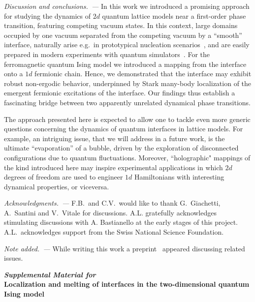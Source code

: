 \documentclass[reprint,aps,prl,superscriptaddress,english,nolongbibliography]{revtex4-2}
\begin{document}
\emph{Discussion and conclusions.~---}
In this work we introduced a promising approach for studying the dynamics of $2d$ quantum lattice models near a first-order phase transition, featuring competing vacuum states. In this context, large domains occupied by one vacuum separated from the competing vacuum by a ``smooth'' interface, naturally arise e.g.\ in prototypical nucleation scenarios~\cite{bray1994theory,onuki2002phase,Coleman1977False,coleman1988aspects,Rutkevich1999Decay}, and are easily prepared in modern experiments with quantum simulators~\cite{labuhn2016tunable,Guardado2018Probing,scholl2021quantum,ebadi2021quantum,Bluvstein2022Quantum}. For the ferromagnetic quantum Ising model we introduced a mapping from the interface onto a $1d$ fermionic chain. Hence, we demonstrated that the interface may exhibit robust non-ergodic behavior, underpinned by Stark many-body localization of the emergent fermionic excitations of the interface. Our findings thus establish a fascinating bridge between two apparently unrelated  dynamical phase transitions.

The approach presented here is expected to allow one to tackle even more generic questions concerning the dynamics of quantum interfaces in lattice models. For example, an intriguing issue, that we will address in a future work, is the ultimate ``evaporation'' of a bubble, driven by the exploration of disconnected configurations due to quantum fluctuations. Moreover, ``holographic" mappings of the kind introduced here may inspire experimental applications in which $2d$ degrees of freedom are used to engineer $1d$ Hamiltonians with interesting dynamical properties, or viceversa.




\begin{acknowledgments}

\emph{Acknowledgments.~---}
F.B.\ and C.V.\ would like to thank G.\ Giachetti, A.\ Santini and V.\ Vitale for discussions.
A.L. gratefully acknowledges stimulating discussions with A. Bastianello at the early stages of this project.
A.L.\ acknowledges support from the Swiss National Science Foundation.

\emph{Note added.~---}
While writing this work a preprint~\cite{Hart2022Hilbert} appeared discussing related issues. 

\end{acknowledgments}



\newpage
\widetext
\begin{center}
\textbf{\large \emph{Supplemental Material for}\\ Localization and melting of interfaces in the two-dimensional quantum Ising model}
\end{center}
\setcounter{equation}{0}
\setcounter{figure}{0}
\setcounter{table}{0}
\makeatletter
\renewcommand{\theequation}{S\arabic{equation}}
\renewcommand{\thefigure}{S\arabic{figure}}
\end{document}
